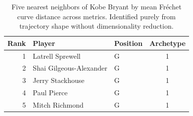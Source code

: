 \begin{table}[htbp]
  \centering\small
  \begin{tabular}{rllc}
    \toprule
    Rank & Player & Position & Archetype \\
    \midrule
    1 & Latrell Sprewell & G & 1 \\
    2 & Shai Gilgeous-Alexander & G & 1 \\
    3 & Jerry Stackhouse & G & 1 \\
    4 & Paul Pierce & G & 1 \\
    5 & Mitch Richmond & G & 1 \\
    \bottomrule
  \end{tabular}
  \caption{Five nearest neighbors of Kobe Bryant by mean Fr\'{e}chet curve distance across metrics. Identified purely from trajectory shape without dimensionality reduction.}
  \label{tab:Kobe_Bryant_frechet_curve_neighbors}
\end{table}

